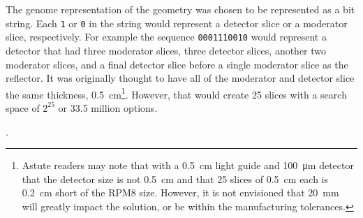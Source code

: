 The genome representation of the geometry was chosen to be represented as a bit string.
Each \verb+1+ or \verb+0+ in the string would represent a detector slice or a moderator slice, respectively.
For example the sequence \verb+0001110010+ would represent a detector that had three moderator slices, three detector slices, another two moderator slices, and a final detector slice before a single moderator slice as the reflector.
It was originally thought to have all of the moderator and detector slice the same thickness, \SI{0.5}{\centi \meter}\footnote{Astute readers may note that with a \SI{0.5}{\centi \meter} light guide and \SI{100}{\micro \meter} detector that the detector size is not \SI{0.5}{\centi\meter} and that 25 slices of \SI{0.5}{\centi\meter} each is \SI{0.2}{\centi\meter} short of the RPM8 size. However, it is not envisioned that \SI{20}{\milli\meter} will greatly impact the solution, or be within the manufacturing tolerances. }.
However, that would create 25 slices with a search space of $2^{25}$ or 33.5 million options.

.
